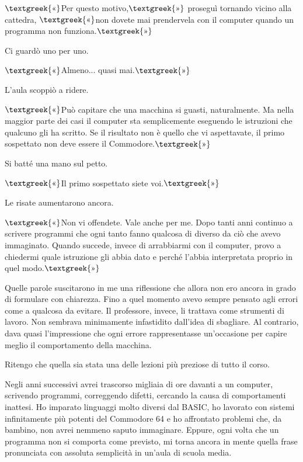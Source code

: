 \documentclass{article}
\begin{document}
$\text{\textgreek{«}}$Per questo motivo,$\text{\textgreek{»}}$ proseguì tornando vicino alla cattedra,
$\text{\textgreek{«}}$non dovete mai prendervela con il computer quando un programma non
funziona.$\text{\textgreek{»}}$

Ci guardò uno per uno.

$\text{\textgreek{«}}$Almeno... quasi mai.$\text{\textgreek{»}}$

L'aula scoppiò a ridere.

$\text{\textgreek{«}}$Può capitare che una macchina si guasti, naturalmente. Ma nella maggior parte dei casi il computer
sta semplicemente eseguendo le istruzioni che qualcuno gli ha scritto. Se il risultato non è quello che vi aspettavate,
il primo sospettato non deve essere il Commodore.$\text{\textgreek{»}}$

Si batté una mano sul petto.

$\text{\textgreek{«}}$Il primo sospettato siete voi.$\text{\textgreek{»}}$

Le risate aumentarono ancora.

$\text{\textgreek{«}}$Non vi offendete. Vale anche per me. Dopo tanti anni continuo a scrivere programmi che ogni tanto
fanno qualcosa di diverso da ciò che avevo immaginato. Quando succede, invece di arrabbiarmi con il computer, provo a
chiedermi quale istruzione gli abbia dato e perché l'abbia interpretata proprio in quel modo.$\text{\textgreek{»}}$

Quelle parole suscitarono in me una riflessione che allora non ero ancora in grado di formulare con chiarezza. Fino a
quel momento avevo sempre pensato agli errori come a qualcosa da evitare. Il professore, invece, li trattava come
strumenti di lavoro. Non sembrava minimamente infastidito dall'idea di sbagliare. Al contrario, dava quasi
l'impressione che ogni errore rappresentasse un'occasione per capire meglio il comportamento della macchina.

Ritengo che quella sia stata una delle lezioni più preziose di tutto il corso.

Negli anni successivi avrei trascorso migliaia di ore davanti a un computer, scrivendo programmi, correggendo difetti,
cercando la causa di comportamenti inattesi. Ho imparato linguaggi molto diversi dal BASIC, ho lavorato con sistemi
infinitamente più potenti del Commodore 64 e ho affrontato problemi che, da bambino, non avrei nemmeno saputo
immaginare. Eppure, ogni volta che un programma non si comporta come previsto, mi torna ancora in mente quella frase
pronunciata con assoluta semplicità in un'aula di scuola media.
\end{document}
